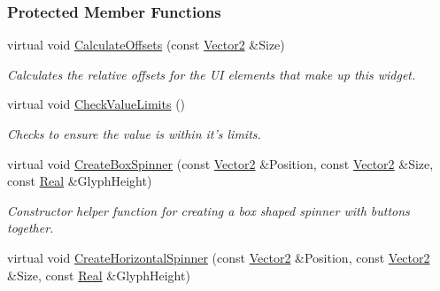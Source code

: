 \subsubsection*{Protected Member Functions}
\begin{DoxyCompactItemize}
\item 
\hypertarget{classphys_1_1UI_1_1Spinner_abbbdba70d318c15564e120136d472ae9}{
virtual void \hyperlink{classphys_1_1UI_1_1Spinner_abbbdba70d318c15564e120136d472ae9}{CalculateOffsets} (const \hyperlink{classphys_1_1Vector2}{Vector2} \&Size)}
\label{classphys_1_1UI_1_1Spinner_abbbdba70d318c15564e120136d472ae9}

\begin{DoxyCompactList}\small\item\em Calculates the relative offsets for the UI elements that make up this widget. \item\end{DoxyCompactList}\item 
\hypertarget{classphys_1_1UI_1_1Spinner_aa39b1f3c2b0ac1bfe6824f6423915918}{
virtual void \hyperlink{classphys_1_1UI_1_1Spinner_aa39b1f3c2b0ac1bfe6824f6423915918}{CheckValueLimits} ()}
\label{classphys_1_1UI_1_1Spinner_aa39b1f3c2b0ac1bfe6824f6423915918}

\begin{DoxyCompactList}\small\item\em Checks to ensure the value is within it's limits. \item\end{DoxyCompactList}\item 
\hypertarget{classphys_1_1UI_1_1Spinner_aeca447d00d7165acb9f6f4cd253607e5}{
virtual void \hyperlink{classphys_1_1UI_1_1Spinner_aeca447d00d7165acb9f6f4cd253607e5}{CreateBoxSpinner} (const \hyperlink{classphys_1_1Vector2}{Vector2} \&Position, const \hyperlink{classphys_1_1Vector2}{Vector2} \&Size, const \hyperlink{namespacephys_af7eb897198d265b8e868f45240230d5f}{Real} \&GlyphHeight)}
\label{classphys_1_1UI_1_1Spinner_aeca447d00d7165acb9f6f4cd253607e5}

\begin{DoxyCompactList}\small\item\em Constructor helper function for creating a box shaped spinner with buttons together. \item\end{DoxyCompactList}\item 
\hypertarget{classphys_1_1UI_1_1Spinner_a74fd8b5185cae46beef77599fe6ef44f}{
virtual void \hyperlink{classphys_1_1UI_1_1Spinner_a74fd8b5185cae46beef77599fe6ef44f}{CreateHorizontalSpinner} (const \hyperlink{classphys_1_1Vector2}{Vector2} \&Position, const \hyperlink{classphys_1_1Vector2}{Vector2} \&Size, const \hyperlink{namespacephys_af7eb897198d265b8e868f45240230d5f}{Real} \&GlyphHeight)}
\label{classphys_1_1UI_1_1Spinner_a74fd8b5185cae46beef77599fe6ef44f}


\end{DoxyCompactItemize}
